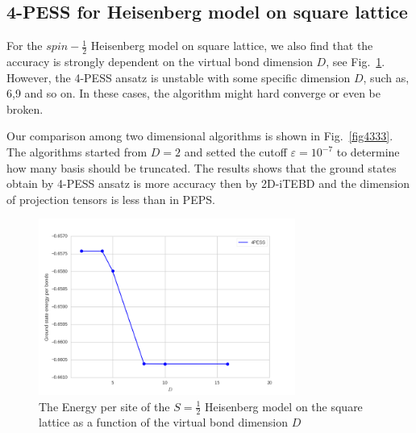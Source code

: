 \subsection{4-PESS for Heisenberg model on square lattice}

For the $spin- \frac{1}{2}$ Heisenberg model on square lattice, we also find that the accuracy is strongly dependent on the virtual bond dimension $D$, see Fig.~\ref{fig4332}. However, the 4-PESS ansatz is unstable with some specific dimension $D$, such as, 6,9 and so on. In these cases, the algorithm might hard converge or even be broken. 

Our comparison among two dimensional algorithms is shown in Fig.~\ref{fig4333}. The algorithms started from $D=2$ and setted the cutoff $\varepsilon = 10^{-7}$ to determine how many basis should be truncated. The results shows that the ground states obtain by 4-PESS ansatz is more accuracy then by 2D-iTEBD and the dimension of projection tensors is less than in PEPS.

\begin{figure}[H]
	\centering
	\includegraphics[width=0.75\textwidth]{figures/4pess_HeiGE.png}
	\caption[The Energy per site of the $S=\frac{1}{2}$ Heisenberg model on the square lattice as a function of the virtual bond dimension $D$]{The Energy per site of the $S=\frac{1}{2}$ Heisenberg model on the square lattice as a function of the virtual bond dimension $D$}
	\label{fig4332}
\end{figure}

